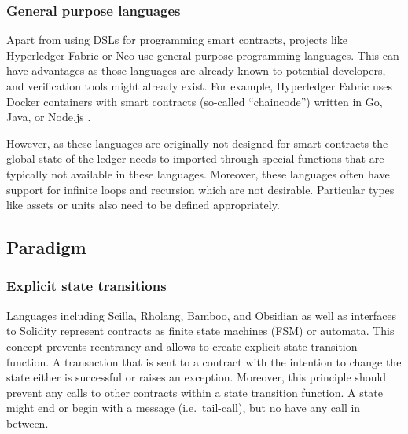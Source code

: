 \subsubsection{General purpose languages}
Apart from using DSLs for programming smart contracts, projects like Hyperledger Fabric or Neo use general purpose programming languages.
This can have advantages as those languages are already known to potential developers, and verification tools might already exist.
For example, Hyperledger Fabric uses Docker containers with smart contracts (so-called ``chaincode'') written in Go, Java, or Node.js \cite{Cachin2016}. 

However, as these languages are originally not designed for smart contracts the global state of the ledger needs to imported through special functions that are typically not available in these languages.
Moreover, these languages often have support for infinite loops and recursion which are not desirable.
Particular types like assets or units also need to be defined appropriately. 

\subsection{Paradigm}

\subsubsection{Explicit state transitions}
Languages including Scilla, Rholang, Bamboo, and Obsidian as well as interfaces to Solidity \cite{Mavridou2018} represent contracts as finite state machines (FSM) or automata. This concept prevents reentrancy and allows to create explicit state transition function. A transaction that is sent to a contract with the intention to change the state either is successful or raises an exception. Moreover, this principle should prevent any calls to other contracts within a state transition function. A state might end or begin with a message (i.e.\ tail-call), but no have any call in between.

